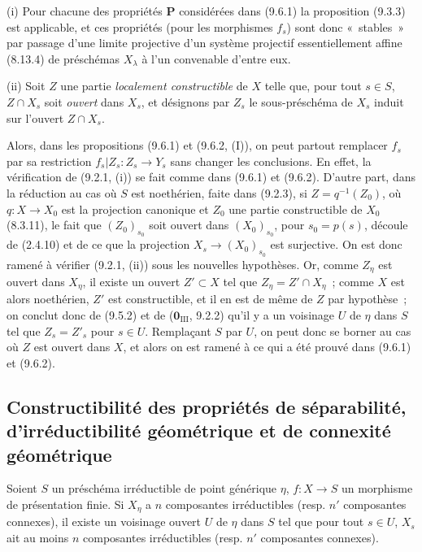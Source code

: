 \begin{remarks}[9.6.7]
\label{IV.9.6.7-fr}
(i) Pour chacune des propriétés $\mathbf P$ considérées dans (9.6.1) la proposition
(9.3.3) est applicable, et ces propriétés (pour les morphismes $f_s$) sont donc
«~stables~» par passage d'une limite projective d'un système projectif
essentiellement affine (8.13.4) de préschémas $X_\lambda$ à l'un convenable
d'entre eux.

(ii) Soit $Z$ une partie \emph{localement constructible} de $X$ telle que, pour
tout $s\in S$, $Z\cap X_s$ soit \emph{ouvert} dans $X_s$, et désignons par
$Z_s$ le sous-préschéma de $X_s$ induit sur l'ouvert $Z\cap X_s$.


Alors, dans les propositions (9.6.1) et (9.6.2, (I)), on peut partout remplacer
$f_s$ par sa restriction $f_s|Z_s:Z_s\to Y_s$ sans changer les conclusions. En
effet, la vérification de (9.2.1, (i)) se fait comme dans (9.6.1) et (9.6.2).
D'autre part, dans la réduction au cas où $S$ est noethérien, faite dans
(9.2.3), si $Z=q^{-1}(Z_0)$, où $q:X\to X_0$ est la projection canonique et
$Z_0$ une partie constructible de $X_0$ (8.3.11), le fait que
$(Z_0)_{s_0}$ soit ouvert dans $(X_0)_{s_0}$, pour $s_0=p(s)$, découle de
(2.4.10) et de ce que la projection $X_s\to(X_0)_{s_0}$ est surjective. On est
donc ramené à vérifier (9.2.1, (ii)) sous les nouvelles hypothèses. Or, comme
$Z_\eta$ est ouvert dans $X_\eta$, il existe un ouvert $Z'\subset X$ tel que
$Z_\eta=Z'\cap X_\eta$~; comme $X$ est alors noethérien, $Z'$ est
constructible, et il en est de même de $Z$ par hypothèse~; on conclut donc de
(9.5.2) et de ($\mathbf 0_{\mathrm{III}}$, 9.2.2) qu'il y a un voisinage $U$
de $\eta$ dans $S$ tel que $Z_s=Z'_s$ pour $s\in U$. Remplaçant $S$ par $U$,
on peut donc se borner au cas où $Z$ est ouvert dans $X$, et alors on est
ramené à ce qui a été prouvé dans (9.6.1) et (9.6.2).
\end{remarks}

\subsection{Constructibilité des propriétés de séparabilité, d'irréductibilité
géométrique et de connexité géométrique}
\label{subsection:IV.9.7-fr}

\begin{lemma}[9.7.1]
\label{IV.9.7.1-fr}
Soient $S$ un préschéma irréductible de point générique $\eta$, $f:X\to S$
un morphisme de présentation finie. Si $X_\eta$ a $n$ composantes irréductibles
(resp. $n'$ composantes connexes), il existe un voisinage ouvert $U$ de $\eta$
dans $S$ tel que pour tout $s\in U$, $X_s$ ait au moins $n$ composantes
irréductibles (resp. $n'$ composantes connexes).
\end{lemma}

